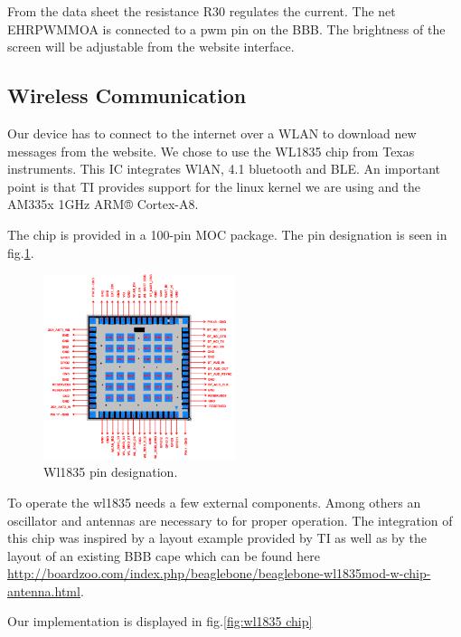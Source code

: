 From the data sheet the resistance R30 regulates the current. The net EHRPWMMOA is connected to a pwm pin on the BBB. The brightness of the screen will be adjustable from the website interface.
\subsection{Wireless Communication}
\label{chap:wireless com}
Our device has to connect to the internet over a WLAN to download new messages from the website. We chose to use the WL1835 chip from Texas instruments. This IC integrates WlAN, 4.1 bluetooth and BLE. An important point is that TI provides support for the linux kernel we are using and the AM335x 1GHz ARM® Cortex-A8.

The chip is provided in a 100-pin MOC package. The pin designation is seen in fig.\ref{fig:wl1835 pin designation}.

\begin{figure}[!htb]
    \centering
    \includegraphics[width=0.5\textwidth,keepaspectratio]{chap/hardFig/100_pin_MOC_wl1835_package}
    \caption{Wl1835 pin designation.}
    \label{fig:wl1835 pin designation}
\end{figure}

To operate the wl1835 needs a few external components. Among others an oscillator and antennas are necessary to for proper operation.
The integration of this chip was inspired by a layout example provided by TI as well as by the layout of an existing BBB cape which can be found here \url{http://boardzoo.com/index.php/beaglebone/beaglebone-wl1835mod-w-chip-antenna.html}.

Our implementation is displayed in fig.\ref{fig:wl1835 chip}




